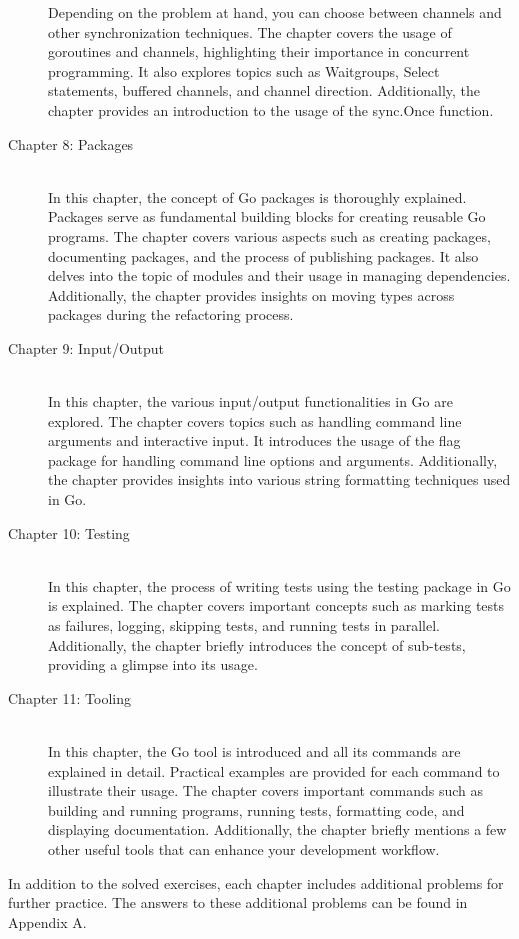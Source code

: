 \begin{description}
Depending on the problem at hand, you can choose between channels and other
synchronization techniques. The chapter covers the usage of goroutines and
channels, highlighting their importance in concurrent programming. It also
explores topics such as Waitgroups, Select statements, buffered channels, and
channel direction. Additionally, the chapter provides an introduction to the
usage of the sync.Once function.
\item[Chapter 8: Packages] \hfill \\
In this chapter, the concept of Go packages is thoroughly explained. Packages
serve as fundamental building blocks for creating reusable Go programs. The
chapter covers various aspects such as creating packages, documenting packages,
and the process of publishing packages. It also delves into the topic of modules
and their usage in managing dependencies. Additionally, the chapter provides
insights on moving types across packages during the refactoring process.
\item[Chapter 9: Input/Output] \hfill \\
In this chapter, the various input/output functionalities in Go are explored.
The chapter covers topics such as handling command line arguments and
interactive input. It introduces the usage of the flag package for handling
command line options and arguments. Additionally, the chapter provides insights
into various string formatting techniques used in Go.
\item[Chapter 10: Testing] \hfill \\
In this chapter, the process of writing tests using the testing package in Go is
explained. The chapter covers important concepts such as marking tests as
failures, logging, skipping tests, and running tests in parallel. Additionally,
the chapter briefly introduces the concept of sub-tests, providing a glimpse
into its usage.
\item[Chapter 11: Tooling] \hfill \\
In this chapter, the Go tool is introduced and all its commands are explained in
detail. Practical examples are provided for each command to illustrate their
usage. The chapter covers important commands such as building and running
programs, running tests, formatting code, and displaying documentation.
Additionally, the chapter briefly mentions a few other useful tools that can
enhance your development workflow.
\end{description}

In addition to the solved exercises, each chapter includes additional problems
for further practice. The answers to these additional problems can be found in
Appendix A.


